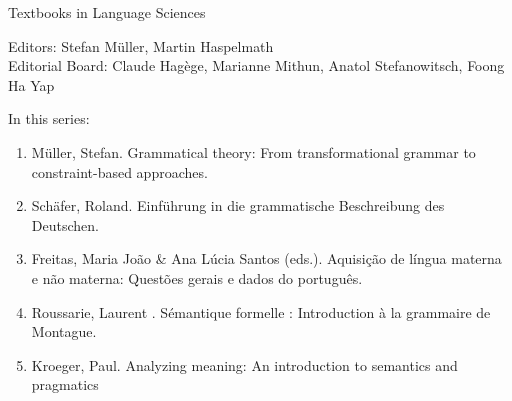 {\large Textbooks in Language Sciences}

\bigskip

Editors: Stefan Müller, Martin Haspelmath  \\
Editorial Board: Claude Hagège, Marianne Mithun, Anatol Stefanowitsch, Foong Ha Yap

\bigskip

In this series:

\begin{enumerate}
\item Müller, Stefan. Grammatical theory: From transformational grammar to constraint-based approaches.
\item Schäfer, Roland. Einführung in die grammatische Beschreibung des Deutschen.
\item Freitas, Maria João \& Ana Lúcia Santos (eds.). Aquisição de língua materna e não materna: Questões gerais e dados do português.
\item Roussarie, Laurent . Sémantique formelle : Introduction à la grammaire de Montague.
\item Kroeger, Paul. Analyzing meaning: An introduction to semantics and pragmatics
\end{enumerate}
